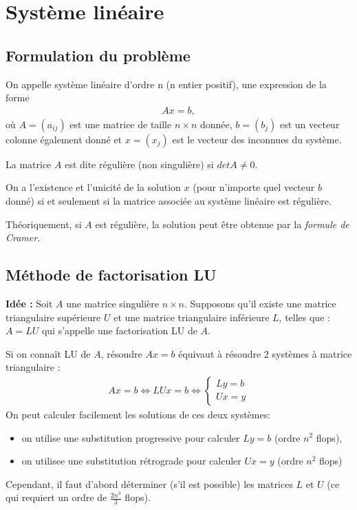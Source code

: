 \chapter{Système linéaire}
\section{Formulation du problème}
On appelle système linéaire d’ordre n (n entier positif), une expression de la 
forme 
\begin{eqnarray}
	Ax = b,
\end{eqnarray}
où $A = (a_{ij})$ est une matrice de taille $n \times n$ donnée, $b = (b_j)$ est un vecteur 
colonne également donné et $x = (x_j)$ est le vecteur des inconnues du système.

La matrice $A$ est dite régulière (non singulière) si $det A \neq 0$.

On a l’existence et l’unicité de la solution $x$ (pour n’importe quel vecteur $b$ donné) si et 
seulement si la matrice associée au système linéaire est régulière.

Théoriquement, si $A$ est régulière, la solution peut être obtenue par la \emph{formule de Cramer}.
\section{Méthode de factorisation LU}
\textbf{Idée :} Soit $A$ une matrice singulière $n\times n$. Supposons qu’il existe une matrice triangulaire supérieure $U$ et une matrice triangulaire 
inférieure $L$, telles que :  $A = LU$ qui s’appelle une factorisation LU de $A$.
 
Si on connaît LU de $A$, résoudre $Ax = b$ équivaut à résoudre 2 systèmes à matrice triangulaire : 
\begin{eqnarray}
	Ax=b 
	\Leftrightarrow 
	LUx=b 
	\Leftrightarrow
	\begin{cases}
		Ly=b
		\\
		Ux=y
	\end{cases}
\end{eqnarray}
On peut calculer facilement les solutions de ces deux systèmes:
\begin{itemize}
	\item on utilise une substitution progressive pour calculer $Ly = b$ (ordre $n^2$ flops),
	\item on utilisee une substitution rétrograde pour calculer $Ux = y$ (ordre $n^2$ flops)
\end{itemize}
Cependant, il faut d’abord déterminer (s’il est possible) les matrices $L$ et $U$ (ce 
qui requiert un ordre de $\frac{2n^3}{3}$ flops). 

